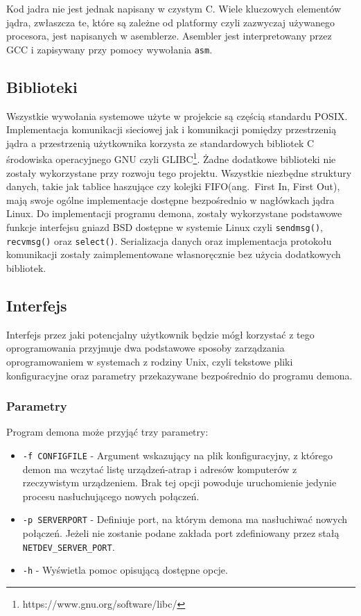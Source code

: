 \documentclass[11pt]{scrartcl}
\begin{document}
Kod jadra nie jest jednak napisany w czystym C. Wiele kluczowych elementów jądra, zwłaszcza te, które są zależne od platformy czyli zazwyczaj używanego procesora, jest napisanych w asemblerze. Asembler jest interpretowany przez GCC i zapisywany przy pomocy wywołania \texttt{asm}\cite{asm}.

\subsection{Biblioteki}
\label{libraries}

Wszystkie wywołania systemowe użyte w projekcie są częścią standardu POSIX\@. Implementacja komunikacji sieciowej jak i komunikacji pomiędzy przestrzenią jądra a przestrzenią użytkownika korzysta ze standardowych bibliotek C środowiska operacyjnego GNU czyli GLIBC\footnote{https://www.gnu.org/software/libc/}. Żadne dodatkowe biblioteki nie zostały wykorzystane przy rozwoju tego projektu.  Wszystkie niezbędne struktury danych, takie jak tablice haszujące czy kolejki FIFO(ang.\ First In, First Out), mają swoje ogólne implementacje dostępne bezpośrednio w nagłówkach jądra Linux. Do implementacji programu demona, zostały wykorzystane podstawowe funkcje interfejsu gniazd BSD dostępne w systemie Linux czyli \texttt{sendmsg()}, \texttt{recvmsg()} oraz \texttt{select()}. Serializacja danych oraz implementacja protokołu komunikacji zostały zaimplementowane własnoręcznie bez użycia dodatkowych bibliotek.

\subsection{Interfejs}

Interfejs przez jaki potencjalny użytkownik będzie mógł korzystać z tego oprogramowania przyjmuje dwa podstawowe sposoby zarządzania oprogramowaniem w systemach z rodziny Unix, czyli tekstowe pliki konfiguracyjne oraz parametry przekazywane bezpośrednio do programu
demona.

\subsubsection{Parametry}

Program demona może przyjąć trzy parametry:

\begin{itemize}
\itemsep1pt\parskip0pt
    \item \texttt{-f CONFIGFILE} - Argument wskazujący na plik konfiguracyjny, z którego demon ma wczytać listę urządzeń-atrap i adresów komputerów z rzeczywistym urządzeniem. Brak tej opcji powoduje uruchomienie jedynie procesu nasłuchującego nowych połączeń.
    \item \texttt{-p SERVERPORT} - Definiuje port, na którym demona ma nasłuchiwać nowych połączeń. Jeżeli nie zostanie podane zakłada port zdefiniowany przez stałą \newline\texttt{NETDEV\_SERVER\_PORT}.
    \item \texttt{-h} - Wyświetla pomoc opisującą dostępne opcje.
\end{itemize}
\end{document}
